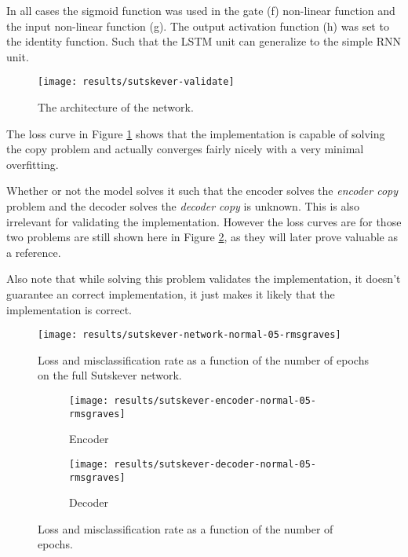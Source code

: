 In all cases the sigmoid function was used in the gate (f) non-linear function and the input non-linear function (g). The output activation function (h) was set to the identity function. Such that the LSTM unit can generalize to the simple RNN unit.

\begin{figure}[H]
	\centering
	\texttt{[image: results/sutskever-validate]}
	\caption{The architecture of the network.}
\end{figure}

The loss curve in Figure \ref{fig:results:sutskever:network-05} shows that the implementation is capable of solving the copy problem and actually converges fairly nicely with a very minimal overfitting.

Whether or not the model solves it such that the encoder solves the \textit{encoder copy} problem and the decoder solves the \textit{decoder copy} is unknown. This is also irrelevant for validating the implementation. However the loss curves are for those two problems are still shown here in Figure \ref{fig:results:sutskever:decoder-encoder-05}, as they will later prove valuable as a reference.

Also note that while solving this problem validates the implementation, it doesn't guarantee an correct implementation, it just makes it likely that the implementation is correct.

\begin{figure}[h]
	\centering
	\texttt{[image: results/sutskever-network-normal-05-rmsgraves]}
	\caption{Loss and misclassification rate as a function of the number of epochs on the full Sutskever network.}
	\label{fig:results:sutskever:network-05}
\end{figure}
\begin{figure}[H]
        \vspace{-0.5cm}
        \centering
        \begin{subfigure}[b]{0.49\textwidth}
                \texttt{[image: results/sutskever-encoder-normal-05-rmsgraves]}
                \caption{Encoder}
        \end{subfigure}
        \begin{subfigure}[b]{0.49\textwidth}
                \texttt{[image: results/sutskever-decoder-normal-05-rmsgraves]}
                \caption{Decoder}
        \end{subfigure}
        \caption{Loss and misclassification rate as a function of the number of epochs.}
        \label{fig:results:sutskever:decoder-encoder-05}
\end{figure}

